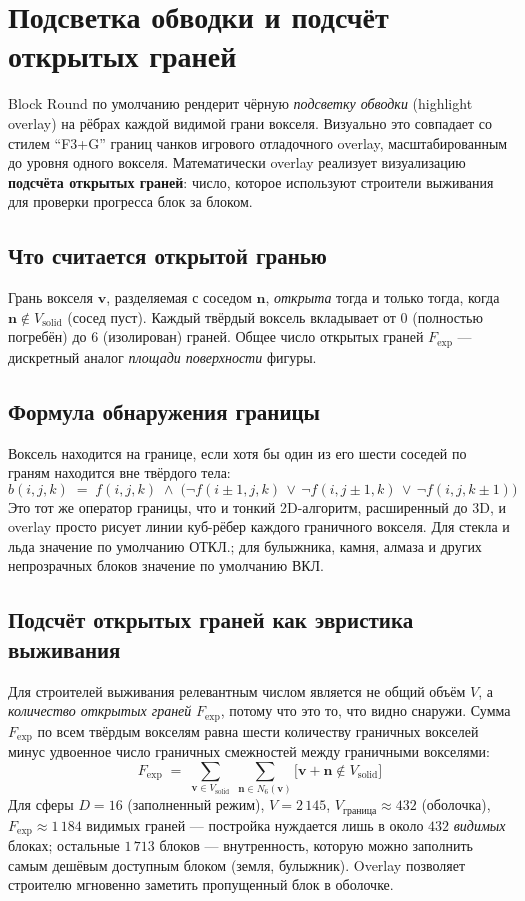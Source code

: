 \documentclass[12pt,a4paper]{scrartcl}
\newcommand{\acc}[1]{\textcolor{accent}{\textbf{#1}}}
\begin{document}
\section{Подсветка обводки и подсчёт открытых граней}

Block Round по умолчанию рендерит чёрную \emph{подсветку обводки} (highlight overlay) на рёбрах каждой видимой грани вокселя. Визуально это совпадает со стилем \enquote{F3+G} границ чанков игрового отладочного overlay, масштабированным до уровня одного вокселя. Математически overlay реализует визуализацию \acc{подсчёта открытых граней}: число, которое используют строители выживания для проверки прогресса блок за блоком.

\subsection{Что считается открытой гранью}
Грань вокселя $\mathbf{v}$, разделяемая с соседом $\mathbf{n}$, \emph{открыта} тогда и только тогда, когда $\mathbf{n} \notin V_{\mathrm{solid}}$ (сосед пуст). Каждый твёрдый воксель вкладывает от $0$ (полностью погребён) до $6$ (изолирован) граней. Общее число открытых граней $F_{\mathrm{exp}}$ — дискретный аналог \emph{площади поверхности} фигуры.

\subsection{Формула обнаружения границы}
Воксель находится на границе, если хотя бы один из его шести соседей по граням находится вне твёрдого тела:
\[
b(i,j,k) \;=\; f(i,j,k) \;\wedge\; \bigl(\neg f(i{\pm}1,j,k)\,\vee\,\neg f(i,j{\pm}1,k)\,\vee\,\neg f(i,j,k{\pm}1)\bigr)
\]
Это тот же оператор границы, что и тонкий 2D-алгоритм, расширенный до 3D, и overlay просто рисует линии куб-рёбер каждого граничного вокселя. Для стекла и льда значение по умолчанию ОТКЛ.; для булыжника, камня, алмаза и других непрозрачных блоков значение по умолчанию ВКЛ.

\subsection{Подсчёт открытых граней как эвристика выживания}
Для строителей выживания релевантным числом является не общий объём $V$, а \emph{количество открытых граней} $F_{\mathrm{exp}}$, потому что это то, что видно снаружи. Сумма $F_{\mathrm{exp}}$ по всем твёрдым вокселям равна шести количеству граничных вокселей минус удвоенное число граничных смежностей между граничными вокселями:
\[
F_{\mathrm{exp}} \;=\; \sum_{\mathbf{v}\in V_{\mathrm{solid}}}\;\sum_{\mathbf{n}\in N_6(\mathbf{v})}\!\!\bigl[\mathbf{v}+\mathbf{n}\notin V_{\mathrm{solid}}\bigr]
\]
Для сферы $D=16$ (заполненный режим), $V = 2\,145$, $V_{\mathrm{граница}} \approx 432$ (оболочка), $F_{\mathrm{exp}} \approx 1\,184$ видимых граней — постройка нуждается лишь в около $432$ \emph{видимых} блоках; остальные $1\,713$ блоков — внутренность, которую можно заполнить самым дешёвым доступным блоком (земля, булыжник). Overlay позволяет строителю мгновенно заметить пропущенный блок в оболочке.
\end{document}
